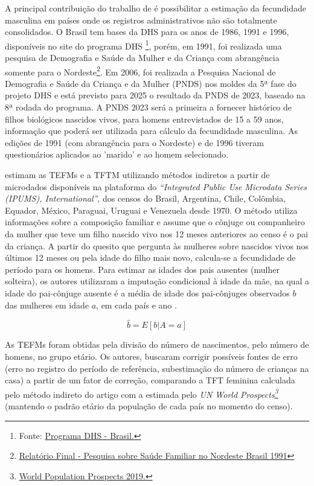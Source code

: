 A principal contribuição do trabalho de  é possibilitar a estimação da fecundidade masculina em países onde os registros administrativos não são totalmente consolidados. O Brasil tem bases da DHS para os anos de 1986, 1991 e 1996, disponíveis no site do programa DHS \footnote{Fonte: \href{https://dhsprogram.com/Countries/Country-Main.cfm?ctry_id=49\&c=Brazil}{Programa DHS - Brasil.}}, porém, em 1991, foi realizada uma pesquisa de Demografia e Saúde da Mulher e da Criança com abrangência somente para o Nordeste\footnote{\href{https://dhsprogram.com/publications/publication-FR5-DHS-Final-Reports.cfm}{Relatório Final - Pesquisa sobre Saúde Familiar no Nordeste Brasil 1991}}. Em 2006, foi realizada a Pesquisa Nacional de Demografia e Saúde da Criança e da Mulher (PNDS) nos moldes da 5ª fase do projeto DHS e está previsto para 2025 o resultado da PNDS de 2023, baseado na 8ª rodada do programa. A PNDS 2023 será a primeira a fornecer histórico de filhos biológicos nascidos vivos, para homens entrevistados de 15 a 59 anos, informação que poderá ser utilizada para cálculo da fecundidade masculina. As edições de 1991 (com abrangência para o Nordeste) e de 1996 tiveram questionários aplicados ao 'marido' e ao homem selecionado.  

 estimam as TEFMs e a TFTM utilizando métodos indiretos a partir de microdados disponíveis na plataforma do \textit{“Integrated Public Use Microdata Series (IPUMS), International”}, dos censos do Brasil, Argentina, Chile, Colômbia, Equador, México, Paraguai, Uruguai e Venezuela desde 1970. O método utiliza informações sobre a composição familiar e assume que o cônjuge ou companheiro da mulher que teve um filho nascido vivo nos 12 meses anteriores ao censo é o pai da criança. A partir do quesito que pergunta às mulheres sobre nascidos vivos nos últimos 12 meses ou pela idade do filho mais novo, calcula-se a fecundidade de período para os homens. Para estimar as idades dos pais ausentes (mulher solteira), os autores utilizaram a imputação condicional à idade da mãe, na qual a idade do pai-cônjuge ausente é a média de idade dos pai-cônjuges observados $b$ das mulheres em idade $a$, em cada país e ano \cite{wong2020LatinA}. 

\begin{equation}
    \hat{b} = E[b|A=a]
\end{equation}

As TEFMs foram obtidas pela divisão do número de nascimentos, pelo número de homens, no grupo etário. Os autores, buscaram corrigir possíveis fontes de erro (erro no registro do período de referência, subestimação do número de crianças na casa) a partir de um fator de correção, comparando a TFT feminina calculada pelo método indireto do artigo com a estimada pelo \textit{UN World Prospects\footnote{\href{https://population.un.org/wpp2019/}{World Population Prospects 2019.}}} (mantendo o padrão etário da população de cada país no momento do censo).     

